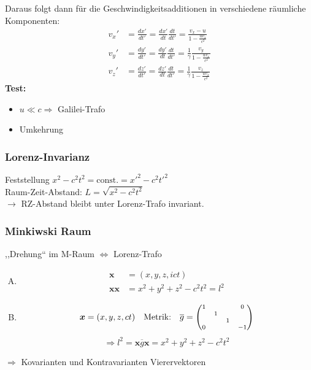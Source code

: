 \documentclass[titlepage,11pt,a4paper,ngerman]{report}
\newcommand{\tx}[1]{\textrm{#1}}
\newcommand{\const}{\tx{const.}}
\renewcommand{\vec}[1]{\boldsymbol{#1}}
\begin{document}
Daraus folgt dann für die Geschwindigkeitsadditionen in verschiedene räumliche Komponenten:
\begin{align*}
v_x' &= \frac{dx'}{dt'} = \frac{dx'}{dt} \frac{dt}{dt'} = \frac{v_x - u}{1 - \frac{uv_x}{c^2}} \\
v_y' &= \frac{dy'}{dt'} = \frac{dy'}{dt} \frac{dt}{dt'} = \frac{1}{\gamma} \frac{v_y}{1 - \frac{uv_x}{c^2}}\\
v_z' &= \frac{dz'}{dt'} = \frac{dz'}{dt} \frac{dt}{dt'} = \frac{1}{\gamma} \frac{v_z}{1 - \frac{uv_x}{c^2}}
\end{align*}
\textbf{Test:}\\
\begin{itemize}
	\item $ u \ll c \Rightarrow $ Galilei-Trafo
	\item Umkehrung
\end{itemize}

\subsubsection{Lorenz-Invarianz}
Feststellung $ x^2 - c^2t^2 = \const = x'^2 - c^2 t'^2 $\\[5pt]
Raum-Zeit-Abstand: $ L = \sqrt{x^2 - c^2 t^2} $\\
$ \rightarrow $ RZ-Abstand bleibt unter Lorenz-Trafo invariant.

\subsubsection{Minkiwski Raum}
,,Drehung`` im M-Raum $ \Leftrightarrow $ Lorenz-Trafo
\begin{enumerate}[A)]
	\item \begin{align*}
	\vec{x} &= (x,y,z,ict) \\
	\vec{x} \vec{x} &= x^2 + y^2 + z^2 - c^2 t^2 = l^2
	\end{align*}
	\item \begin{equation*}
	\vec{x} = (x,y,z,ct) \quad  \tx{Metrik:} \quad  \overline{g} = \begin{scriptsize}\begin{pmatrix}
	1 & & & 0 \\ & 1\\ & & 1 \\ 0 & & & -1
	\end{pmatrix}\end{scriptsize} \end{equation*}
	\begin{equation*}
	\Rightarrow l^2 = \vec{x} \overline{g} \vec{x} = x^2 + y^2 + z^2 - c^2 t^2
	\end{equation*}
\end{enumerate}
$ \Rightarrow $ Kovarianten und Kontravarianten Vierervektoren
\end{document}

